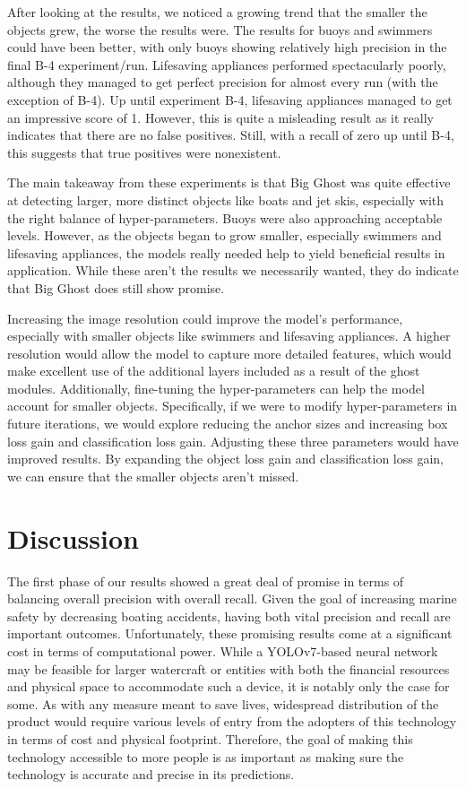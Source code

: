 \documentclass[sigplan,nonacm]{acmart}
\begin{document}
After looking at the results, we noticed a growing trend that the smaller the objects grew, the worse the results were. The results for buoys and swimmers could have been better, with only buoys showing relatively high precision in the final B-4 experiment/run. Lifesaving appliances performed spectacularly poorly, although they managed to get perfect precision for almost every run (with the exception of B-4). Up until experiment B-4, lifesaving appliances managed to get an impressive score of 1. However, this is quite a misleading result as it really indicates that there are no false positives. Still, with a recall of zero up until B-4, this suggests that true positives were nonexistent.

The main takeaway from these experiments is that Big Ghost was quite effective at detecting larger, more distinct objects like boats and jet skis, especially with the right balance of hyper-parameters. Buoys were also approaching acceptable levels. However, as the objects began to grow smaller, especially swimmers and lifesaving appliances, the models really needed help to yield beneficial results in application. While these aren't the results we necessarily wanted, they do indicate that Big Ghost does still show promise. 

Increasing the image resolution could improve the model's performance, especially with smaller objects like swimmers and lifesaving appliances. A higher resolution would allow the model to capture more detailed features, which would make excellent use of the additional layers included as a result of the ghost modules. Additionally, fine-tuning the hyper-parameters can help the model account for smaller objects. Specifically, if we were to modify hyper-parameters in future iterations, we would explore reducing the anchor sizes and increasing box loss gain and classification loss gain. Adjusting these three parameters would have improved results. By expanding the object loss gain and classification loss gain, we can ensure that the smaller objects aren't missed. 

\section*{Discussion}

The first phase of our results showed a great deal of promise in terms of balancing overall precision with overall recall. Given the goal of increasing marine safety by decreasing boating accidents, having both vital precision and recall are important outcomes. Unfortunately, these promising results come at a significant cost in terms of computational power. While a YOLOv7-based neural network may be feasible for larger watercraft or entities with both the financial resources and physical space to accommodate such a device, it is notably only the case for some. As with any measure meant to save lives, widespread distribution of the product would require various levels of entry from the adopters of this technology in terms of cost and physical footprint. Therefore, the goal of making this technology accessible to more people is as important as making sure the technology is accurate and precise in its predictions. 
\end{document}
